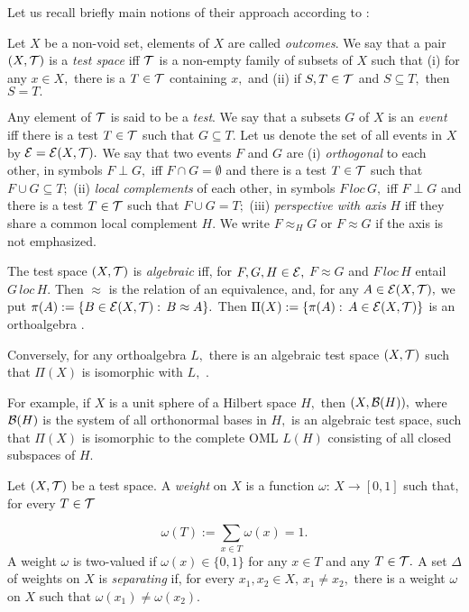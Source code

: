 Let us recall briefly main notions of their approach according to \cite{FB1}:


Let $X$ be a non-void set, elements of $X$ are called {\it outcomes}. We say
that a pair $(X,\cal T)$ is a {\it test space} iff $\cal T$ is a non-empty
family of subsets of $X$ such that (i) for any $x \in X,$ there is a $T \in
\cal T$ containing $x,$ and (ii) if $S,T \in \cal T$ and $S \subseteq T,$
then $S = T.$

Any element of $\cal T$ is said to be a {\it test}. We say that a subsets
$G$ of $X$ is an {\it event} iff there is a test $T \in \cal T$ such
that $G \subseteq T.$ Let us denote the set of all events in $X$ by
${\cal E} = {\cal E}(X,{\cal T}).$ We say that two events $F$ and $G$ are (i)
{\it orthogonal} to each other, in symbols $F \perp
G,$ iff $F \cap G = \emptyset$ and
there is a test $T \in {\cal T}$ such that $F \cup G \subseteq T;$
 (ii)  {\it local complements} of each other, in symbols $F\, loc\,G,$
iff $F \perp G$ and
there is a test $T \in {\cal T}$ such that $F  \cup G = T;$
 (iii) {\it perspective with axis} $H$
iff they share a common local complement $H.$ We write $F \approx_H G$ or
$F \approx G$ if the axis is not emphasized.

The test space $(X,\cal T)$ is {\it algebraic}
iff, for $F,G,H \in \cal E,$ $F\approx G$ and $F \, loc \, H$ entail $G \, loc\, H.$
Then $\approx $ is the relation of an equivalence, and, for any $A \in{\cal
E}(X,{\cal T}),$ we put $\pi(A) :=\{B \in {\cal E}(X,{\cal T}): \, B \approx A\}.$
Then $\Pi(X) :=\{\pi(A):\, A \in {\cal E}(X,{\cal T})\}$ is an orthoalgebra
\cite{FB1}.

Conversely, for any orthoalgebra $L,$ there is an algebraic test space $(X,{\cal T})$
such that $\Pi(X)$ is isomorphic with $L,$  \cite{FB1, Gud}.

For example, if $X$ is a unit sphere of a Hilbert space $H,$ then
$(X, {\cal B}(H)),$ where ${\cal B}(H)$ is the system of all orthonormal
bases in $H,$ is an algebraic test space, such that $\Pi(X)$ is
isomorphic to the complete OML $L(H)$ consisting of all closed subspaces
of $H.$

Let $(X,{\cal T})$ be a test space. A {\it weight} on $X$ is a function
$\omega:\, X \to [0,1]$ such that, for every $T \in {\cal T}$

\[ \omega(T) := \sum_{x \in T} \omega(x) = 1.\]
A weight $\omega$ is two-valued if $\omega(x) \in \{0,1\}$ for
any $x \in T$ and any $T \in {\cal T}.$ A set $\Delta$ of weights
on $X$ is {\it separating} if, for every $x_1, x_2 \in X,\, x_1
\ne x_2,$ there is a weight $\omega$ on $X$ such that
$\omega(x_1) \ne \omega(x_2).$


